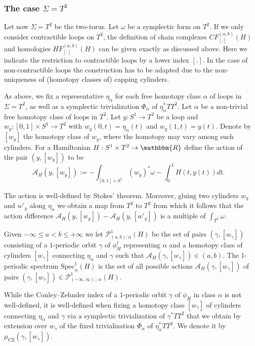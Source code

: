 \documentclass[AHL,Unicode,longabstracts,published]{cedram}
\newcommand{\R}{\mathbbm{R}}
\newcommand{\Spec}{\mathrm{Spec}}
\newcommand{\rCZ}{\mathrm{CZ}}
\newcommand{\clP}{\mathcal{P}}
\newcommand{\clA}{\mathcal{A}}
\begin{document}
\subsubsection{The case \texorpdfstring{$\Sigma = T^2$}{Sigma = T2}}\label{sec:Hamontorus}

Let now $\Sigma=T^2$ be the two-torus. Let $\omega$ be a symplectic form on $T^2$. If we only consider contractible loops on $T^2$, the definition of chain complexes $CF^{(a,b)}_{[.]}(H)$ and homologies $HF^{(a,b)}_{[.]}(H)$ can be given exactly as discussed above. Here we indicate the restriction to contractible loops by a lower index $[.]$. In the case of non-contractible loops the construction has to be adapted due to the non-uniqueness of (homotopy classes of) capping cylinders.

As above, we fix a representative $\eta_{\alpha}$ for each free homotopy class $\alpha$ of loops in $\Sigma = T^2$, as well as a symplectic trivialization $\Phi_{\alpha}$ of $\eta_{\alpha}^*T T^2$. Let $\alpha$ be a non-trivial free homotopy class of loops in $T^2$. Let $y: S^1 \to T^2$ be a loop and $w_y:[0,1] \times S^1 \to T^2$ with $w_y(0,t) = \eta_{\alpha}(t)$ and $w_y(1,t) = y(t)$. Denote by $[w_y]$ the homotopy class of $w_y$, where the homotopy may vary among such cylinders. For a Hamiltonian $H:S^1 \times T^2 \to \R$ define the action of the pair $(y,[w_y])$ to be
\begin{equation}
\clA_H(y,[w_y]) := -\int_{[0,1] \times S^1} (w_{y})^{*} \omega - \int_0^1 H(t,y(t))dt.
\end{equation}

The action is well-defined by Stokes' theorem. Moreover, gluing two cylinders $w_y$ and $w'_y$ along $\eta_\alpha$ we obtain a map from $T^2$ to $T^2$ from which it follows that the action difference $\clA_H(y,[w_y]) - \clA_H(y,[w'_y])$ is a multiple of $\int_{T^2}\omega$.

Given $-\infty \leq a<b\leq +\infty$ we let $\clP^1_{(a,b); \alpha}(H)$ be the set of pairs $(\gamma,[w_\gamma])$ consisting of a $1$-periodic orbit $\gamma$ of $\phi^t_H$ representing $\alpha$ and a homotopy class of cylinders $[w_\gamma]$ connecting $\eta_{\alpha}$ and $\gamma$ such that $\clA_H(\gamma,[w_\gamma])\in (a,b) $. The $1$-periodic spectrum $\Spec_\alpha^1(H)$ is the set of all possible actions $\clA_H(\gamma,[w_\gamma])$ of pairs $(\gamma,[w_\gamma]) \in \clP^1_{(-\infty,\infty)\,;\,\alpha}(H)$.

While the Conley--Zehnder index of a $1$-periodic orbit $\gamma$ of $\phi_H$ in class $\alpha$ is not well-defined, it is well-defined when fixing a homotopy class $[w_\gamma]$ of cylinders connecting $\eta_\alpha$ and $\gamma$ via a symplectic trivialization of $\gamma^*T T^2$ that we obtain by extension over $w_\gamma$ of the fixed trivialization $\Phi_\alpha$ of $\eta_{\alpha}^*TT^2$. We denote it by $\mu_{\rCZ}(\gamma, [w_\gamma])$.
\end{document}
